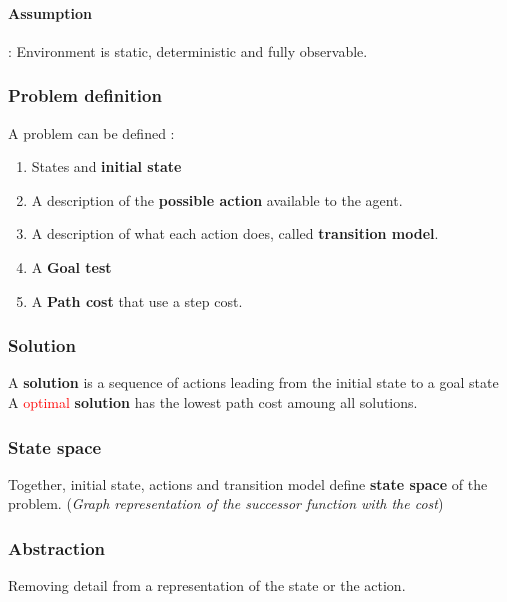 \paragraph{Assumption} : Environment is  static, deterministic and fully
observable.

\subsubsection{Problem definition}
A problem can be defined :
\begin{enumerate}
    \item States and \textbf{initial state}
    \item A description of the  \textbf{possible action} available to the
    agent. 
    \item A description of what each action does, called \textbf{transition
        model}. 
    \item A \textbf{Goal test}
    \item A \textbf{Path cost} that use a step cost.
\end{enumerate}

\subsubsection{Solution} 
A  \textbf{solution}  is a  sequence  of actions  leading
from  the  initial state  to  a  goal state  A  \textcolor{red}{optimal}
\textbf{solution} has the lowest path cost amoung all solutions.

\subsubsection{State space}
Together,   initial  state,   actions   and   transition  model   define
\textbf{state space}  of the  problem. (\textit{Graph  representation of
the successor function with the cost})

\subsubsection{Abstraction}
Removing detail from a representation of the state or the action.

